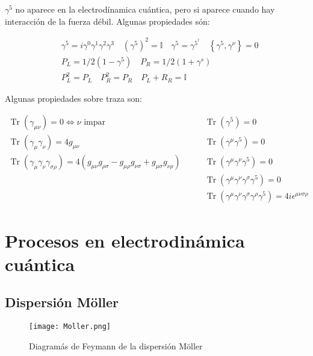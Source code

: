   $\gamma ^5$ no aparece en la electrodínamica cuántica, pero si aparece cuando hay interacción de la fuerza débil. Algunas propiedades són:

  \begin{equation}
    \begin{aligned}
    & \gamma^5=i \gamma^0 \gamma^1 \gamma^2 \gamma^3 \quad\left(\gamma^5\right)^2=\mathbb{I}\quad  \gamma^5=\gamma^{5^\dagger} \quad\left\{\gamma^5, \gamma^\nu\right\}=0 \\
    & P_L=1 / 2\left(1-\gamma^5\right) \quad P_R=1 / 2\left(1+\gamma^s\right) \\
    & P_L^2=P_L \quad P_R^2=P_R \quad P_L+R_R=\mathbb{I}
    \end{aligned}
    \end{equation}

    Algunas propiedades sobre traza son:
    
    \begin{equation}
      \begin{aligned}
      \operatorname{Tr}\left(\gamma_{\mu\nu}\right)=0\Leftrightarrow\nu\text{ impar} \quad& \quad\operatorname{Tr}\left(\gamma^5\right)=0 \\
      \operatorname{Tr}\left(\gamma_\mu\gamma_\nu\right)=4g_{\mu\nu}\quad& \quad \operatorname{Tr}\left(\gamma^\mu \gamma^5\right)=0 \\
      \operatorname{Tr}\left(\gamma_\mu\gamma_\nu\gamma_{\sigma\rho}\right)=4\left(g_{\mu\nu}g_{\rho\sigma}-g_{\mu\rho}g_{\nu\sigma}+g_{\mu\sigma}g_{\nu\rho}\right)\quad& \quad \operatorname{Tr}\left(\gamma^\mu \gamma^\nu \gamma^5\right)=0 \\
      \quad& \quad \operatorname{Tr}\left(\gamma^\mu \gamma^\nu \gamma^\sigma \gamma^5\right)=0 \\
      \quad& \quad \operatorname{Tr}\left(\gamma^\mu \gamma^\nu \gamma^\sigma \gamma^\rho \gamma^5\right)=4i\epsilon^{\mu\nu\sigma\rho}
      \end{aligned}
      \end{equation}
  
\section{Procesos en electrodinámica cuántica}
\subsection{Dispersión Möller}
\begin{figure}
  \centering
  \texttt{[image: Moller.png]}
  \caption{Diagramás de Feymann de la dispersión Möller}
\end{figure}
